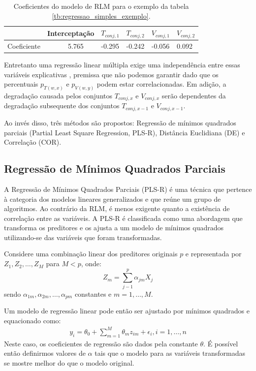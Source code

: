 \begin{table}[H]
	\centering
	\caption{Coeficientes do modelo de RLM para o exemplo da tabela \ref{tb:regressao_simples_exemplo}.}
	\begin{tabular}{@{}l|l|l|l|l|l@{}}
		\toprule
		& Interceptação & $T_{conj,1}$ & $T_{conj,2}$ & $V_{conj,1}$ & $V_{conj,2}$ \\ \midrule
		Coeficiente & \ \ \ \ \ \ 5.765 & -0.295 & -0.242 & -0.056 & 0.092 \\ \bottomrule
	\end{tabular}
	
	\label{tb:regressao_multipla_coeficientes}
\end{table}
Entretanto uma regressão linear múltipla exige uma independência entre essas variáveis explicativas \cite{Chatterjee}, premissa que não podemos garantir dado que os percentuais $p_{T(w,x)}$ e $p_{V(w,y)}$ podem estar correlacionadas. Em adição, a degradação causada pelos conjuntos $T_{conj,x}$ e $V_{conj,x}$ serão dependentes da degradação subsequente dos conjuntos $T_{conj,x-1}$ e $V_{conj,x-1}$.

Ao invés disso, três métodos são propostos: Regressão de mínimos quadrados parciais (Partial Least Square Regression, PLS-R), Distância Euclidiana (DE) e Correlação (COR).
\subsection{Regressão de Mínimos Quadrados Parciais}
\label{subsection_estimativas_PLSR}
A Regressão de Mínimos Quadrados Parciais (PLS-R) é uma técnica que pertence à categoria dos modelos lineares generalizados e que reúne um grupo de algoritmos. Ao contrário da RLM, é menos exigente quanto a existência de correlação entre as variáveis. A PLS-R é classificada como uma abordagem que transforma os preditores e os ajusta a um modelo de mínimos quadrados utilizando-se das variáveis que foram transformadas.

Considere uma combinação linear dos preditores originais $p$ e representada por $Z_1,Z_2,\dots,Z_M$ para $M < p$, onde:
\begin{equation}
Z_m = \sum_{j-1}^{p}\alpha_{jm}X_j
\label{eq:combinacoes_lineares}
\end{equation}
sendo $\alpha_{1m},\alpha_{2m},\dots,\alpha_{pm}$ constantes e $m=1,\dots,M$.

Um modelo de regressão linear pode então ser ajustado por mínimos quadrados e equacionado como:
\begin{eqnarray}
y_i=\theta_0+\sum_{m=1}^{M}\theta_mz_{im}+\epsilon_i, i=1,\dots,n
\label{eq:RLM_PLS}
\end{eqnarray}
Neste caso, os coeficientes de regressão são dados pela constante $\theta$. É possível então definirmos valores de $\alpha$ tais que o modelo para as variáveis transformadas se mostre melhor do que o modelo original.

